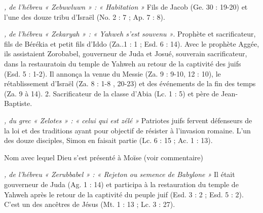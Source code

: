 \begin{multicols}{2}
\textit{, de l'hébreu « Zebuwluwn » : « Habitation »}\newline
Fils de Jacob (Ge. 30 : 19-20) et l'une des douze tribu d'Israël (No. 2 : 7 ; Ap. 7 : 8).

\textit{, de l'hébreu « Zekaryah » : « Yahweh s'est souvenu »}. Prophète et sacrificateur, fils de Bérékia et petit fils d'Iddo (Za..1 : 1 ; Esd. 6 : 14). Avec le prophète Aggée, ils assistaient Zorobabel, gouverneur de Juda et Josué, souverain sacrificateur, dans la restauratoin du temple de Yahweh au retour de la captivité des juifs (Esd. 5 : 1-2). Il annonça la venue du Messie (Za. 9 : 9-10, 12 : 10), le rétablissement d'Israël (Za. 8 : 1-8 , 20-23) et des événements de la fin des temps (Za. 9 à 14).
2. Sacrificateur de la classe d'Abia (Lc. 1 : 5) et père de Jean-Baptiste.

\textit{, du grec « Zelotes » : « celui qui est zélé »}\newline
Patriotes juifs fervent défenseurs de la loi et des traditions ayant pour objectif de résister à l'invasion romaine. L'un des douze disciples, Simon en faisait partie (Lc. 6 : 15 ; Ac. 1 : 13).

\textit{}\newline
Nom avec lequel Dieu s'est présenté à Moïse (voir commentaire)

\textit{, de l'hébreu « Zerubbabel » : « Rejeton ou semence de Babylone »}\newline
Il était gouverneur de Juda (Ag. 1 : 14) et participa à la restauration du temple de Yahweh après le retour de la captivité du peuple juif (Esd. 3 : 2 ; Esd. 5 : 2). C'est un des ancêtres de Jésus (Mt. 1 : 13 ; Lc. 3 : 27).

\end{multicols}
